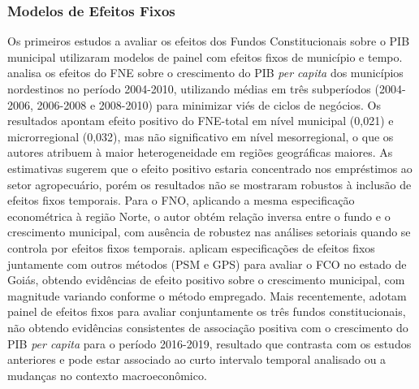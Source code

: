 


\subsubsection{Modelos de Efeitos Fixos}

Os primeiros estudos a avaliar os efeitos dos Fundos Constitucionais sobre o PIB municipal utilizaram modelos de painel com efeitos fixos de município e tempo.  analisa os efeitos do FNE sobre o crescimento do PIB \textit{per capita} dos municípios nordestinos no período 2004-2010, utilizando médias em três subperíodos (2004-2006, 2006-2008 e 2008-2010) para minimizar viés de ciclos de negócios. Os resultados apontam efeito positivo do FNE-total em nível municipal (0,021) e microrregional (0,032), mas não significativo em nível mesorregional, o que os autores atribuem à maior heterogeneidade em regiões geográficas maiores. As estimativas sugerem que o efeito positivo estaria concentrado nos empréstimos ao setor agropecuário, porém os resultados não se mostraram robustos à inclusão de efeitos fixos temporais. Para o FNO, aplicando a mesma especificação econométrica à região Norte, o autor obtém relação inversa entre o fundo e o crescimento municipal, com ausência de robustez nas análises setoriais quando se controla por efeitos fixos temporais.  aplicam especificações de efeitos fixos juntamente com outros métodos (PSM e GPS) para avaliar o FCO no estado de Goiás, obtendo evidências de efeito positivo sobre o crescimento municipal, com magnitude variando conforme o método empregado. Mais recentemente,  adotam painel de efeitos fixos para avaliar conjuntamente os três fundos constitucionais, não obtendo evidências consistentes de associação positiva com o crescimento do PIB \textit{per capita} para o período 2016-2019, resultado que contrasta com os estudos anteriores e pode estar associado ao curto intervalo temporal analisado ou a mudanças no contexto macroeconômico.


